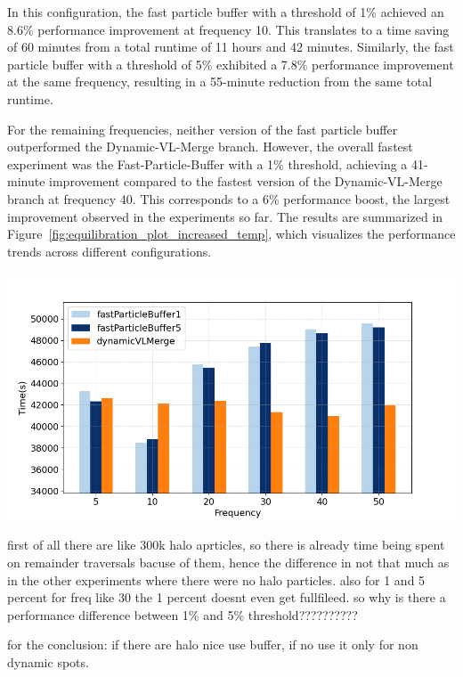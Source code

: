In this configuration, the fast particle buffer with a threshold of 1\% achieved an 8.6\% performance improvement at frequency 10. This translates to a time saving of 60 minutes from a total runtime of 11 hours and 42 minutes. Similarly, the fast particle buffer with a threshold of 5\% exhibited a 7.8\% performance improvement at the same frequency, resulting in a 55-minute reduction from the same total runtime.

For the remaining frequencies, neither version of the fast particle buffer outperformed the Dynamic-VL-Merge branch. However, the overall fastest experiment was the Fast-Particle-Buffer with a 1\% threshold, achieving a 41-minute improvement compared to the fastest version of the Dynamic-VL-Merge branch at frequency 40. This corresponds to a 6\% performance boost, the largest improvement observed in the experiments so far. The results are summarized in Figure~\ref{fig:equilibration_plot_increased_temp}, which visualizes the performance trends across different configurations.

\begin{center}
\includegraphics[width=0.8\linewidth]{graphs/spinodalDecomposition/vlcc08_increased.png}
\captionsetup{hypcap=false}
\label{fig:equilibration_plot_increased_temp}
\end{center}


first of all there are like 300k halo aprticles, so there is already time being spent on remainder traversals bacuse of them, hence the difference in not that much as in the other experiments where there were no halo particles. also for 1 and 5 percent for freq like 30 the 1 percent doesnt even get fullfileed. so why is there a performance difference between 1\% and 5\% threshold??????????

for the conclusion: if there are halo nice use buffer, if no use it only for non dynamic spots.

